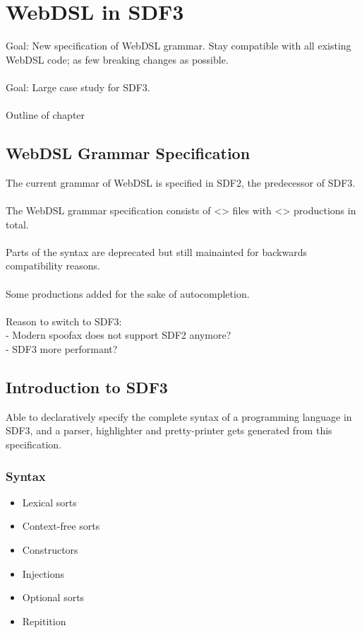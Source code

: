 
\chapter{\label{chap:sdf3}WebDSL in SDF3}

  Goal: New specification of WebDSL grammar. Stay compatible with all existing WebDSL code; as few breaking changes as possible.
  \\\\Goal: Large case study for SDF3.
  \\\\Outline of chapter

  \section{\label{sec:webdsl-grammar}WebDSL Grammar Specification}

    The current grammar of WebDSL is specified in SDF2, the predecessor of SDF3.
    \\\\The WebDSL grammar specification consists of <> files with <> productions in total.
    \\\\Parts of the syntax are deprecated but still mainainted for backwards compatibility reasons.
    \\\\Some productions added for the sake of autocompletion.
    \\\\Reason to switch to SDF3:
    \\- Modern spoofax does not support SDF2 anymore?
    \\- SDF3 more performant?

  \section{\label{sec:sdf3}Introduction to SDF3}

    Able to declaratively specify the complete syntax of a programming language in SDF3, and a parser, highlighter and pretty-printer gets generated from this specification.

    \subsection{\label{subsec:sdf3-syntax}Syntax}

      \begin{itemize}
        \item Lexical sorts
        \item Context-free sorts
        \item Constructors
        \item Injections
        \item Optional sorts
        \item Repitition
      \end{itemize}

